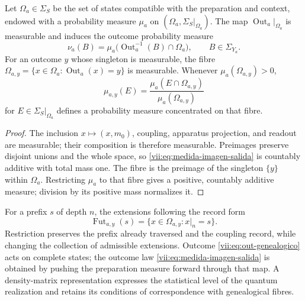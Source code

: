 \begin{proposition}
\label{vii:prop:medida-salida}
Let \(\Omega_a\in\Sigma_S\) be the set of states compatible with the
preparation and context, endowed with a probability measure \(\mu_a\)
on \((\Omega_a,\Sigma_S|_{\Omega_a})\).
The map \(\operatorname{Out}_a|_{\Omega_a}\) is measurable and induces
the outcome probability measure
\begin{equation}
 \nu_a(B)=\mu_a\bigl(\operatorname{Out}_a^{-1}(B)\cap\Omega_a\bigr),
 \qquad B\in\Sigma_{Y_a}.
 \label{vii:eq:medida-imagen-salida}
\end{equation}
For an outcome \(y\) whose singleton is measurable, the fibre
\(\Omega_{a,y}=\{x\in\Omega_a:\operatorname{Out}_a(x)=y\}\)
is measurable. Whenever \(\mu_a(\Omega_{a,y})>0\),
\begin{equation}
 \mu_{a,y}(E)=
 \frac{\mu_a(E\cap\Omega_{a,y})}{\mu_a(\Omega_{a,y})}
 \label{vii:eq:condicionamiento-salida}
\end{equation}
for \(E\in\Sigma_S|_{\Omega_a}\) defines a probability measure
concentrated on that fibre.
\end{proposition}
\begin{proof}
The inclusion \(x\mapsto(x,m_0)\), coupling, apparatus projection, and
readout are measurable; their composition is therefore measurable.
Preimages preserve disjoint unions and the whole space, so
\eqref{vii:eq:medida-imagen-salida} is countably additive with total mass
one. The fibre is the preimage of the singleton \(\{y\}\) within
\(\Omega_a\). Restricting \(\mu_a\) to that fibre gives a positive,
countably additive measure; division by its positive mass normalizes it.
\end{proof}

For a prefix \(s\) of depth \(n\), the extensions following the record
form
\[
 \operatorname{Fut}_{a,y}(s)
 =\{x\in\Omega_{a,y}:x|_n=s\}.
\]
Restriction preserves the prefix already traversed and the coupling
record, while changing the collection of admissible extensions. Outcome
\eqref{vii:eq:out-genealogico} acts on complete states; the outcome law
\eqref{vii:eq:medida-imagen-salida} is obtained by pushing the preparation
measure forward through that map. A density-matrix representation expresses the statistical level of the
quantum realization and retains its conditions of correspondence with
genealogical fibres.
